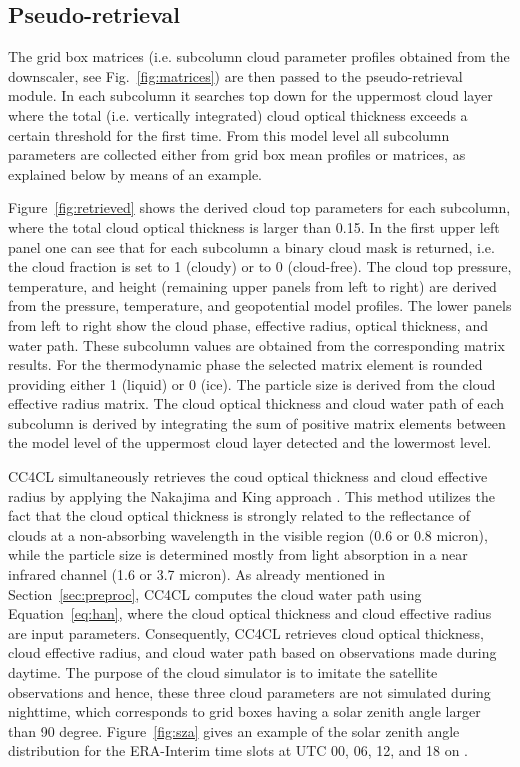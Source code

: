 \subsection{Pseudo-retrieval}\label{sec:pseudo-retrieval}

The grid box matrices (i.e. subcolumn cloud parameter profiles obtained from 
the downscaler, see Fig.~\ref{fig:matrices}) are then passed to the pseudo-retrieval module.
In each subcolumn it searches top down for the uppermost cloud layer where the 
total (i.e. vertically integrated) cloud optical thickness 
exceeds a certain threshold for the first time. 
From this model level all subcolumn parameters are collected 
either from grid box mean profiles or matrices, as explained below by means of an example.

Figure~\ref{fig:retrieved} shows the derived cloud top parameters for each subcolumn, 
where the total cloud optical thickness is larger than 0.15. 
In the first upper left panel one can see that for each subcolumn a binary cloud mask 
is returned, i.e. the cloud fraction is set to 1 (cloudy) or to 0 (cloud-free).
The cloud top pressure, temperature, and height (remaining upper panels from left to right) 
are derived from the pressure, temperature, and geopotential model profiles.
The lower panels from left to right show the cloud phase, effective radius, optical thickness, 
and water path. These subcolumn values are obtained from the corresponding matrix results.
For the thermodynamic phase the selected matrix element is rounded 
providing either 1 (liquid) or 0 (ice).
The particle size is derived from the cloud effective radius matrix.
The cloud optical thickness and cloud water path of each subcolumn 
is derived by integrating the sum of positive matrix elements between
the model level of the uppermost cloud layer detected and the lowermost level.

CC4CL simultaneously retrieves the coud optical thickness and cloud effective radius 
by applying the Nakajima and King approach \cite{Nakajima1990}.
This method utilizes the fact that the cloud optical thickness is strongly related 
to the reflectance of clouds at a non-absorbing wavelength 
in the visible region (0.6 or 0.8 micron), while the particle size is determined 
mostly from light absorption in a near infrared channel (1.6 or 3.7 micron).
As already mentioned in Section~\ref{sec:preproc}, 
CC4CL computes the cloud water path using Equation~\ref{eq:han},
where the cloud optical thickness and cloud effective radius are input parameters.
Consequently, CC4CL retrieves cloud optical thickness, cloud effective radius, and 
cloud water path based on observations made during daytime.
The purpose of the cloud simulator is to imitate the satellite observations and hence, 
these three cloud parameters are not simulated during nighttime, 
which corresponds to grid boxes having a solar zenith angle larger than 90 degree.
Figure~\ref{fig:sza} gives an example of the solar zenith angle distribution 
for the ERA-Interim time slots at UTC 00, 06, 12, and 18 on {\gcdate}.

